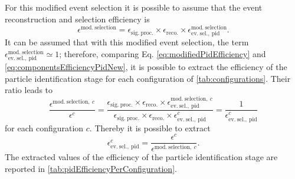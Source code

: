 For this modified event selection it is possible to assume that the event reconstruction and selection efficiency is \begin{equation}
    \epsilon^\mathrm{mod.\ selection} = \epsilon_\mathrm{sig.\ proc.} \times 
        \epsilon_\mathrm{reco.} \times 
        \epsilon_\mathrm{ev.\ sel.,\ pid}^\mathrm{mod.\ selection}. 
        \label{eq:modifiedPidEfficiency}
\end{equation} It can be assumed that with this modified event selection, the term $\epsilon_\mathrm{ev.\ sel.,\ pid}^\mathrm{mod.\ selection}\simeq1$; therefore, comparing Eq. \eqref{eq:modifiedPidEfficiency} and \eqref{eq:componentsEfficiencyPidNew}, it is possible to extract the efficiency of the particle identification stage for each configuration of \autoref{tab:configurations}. Their ratio leads to \begin{equation}
    \frac{
    \epsilon^{\mathrm{mod.\ selection,}\ c}
    }{
    \epsilon^{c}
    } = \frac{
    \epsilon_\mathrm{sig.\ proc.} \times 
    \epsilon_\mathrm{reco.} \times 
    \epsilon_\mathrm{ev.\ sel.,\ pid}^{\mathrm{mod.\ selection,}\ c}
    }{
    \epsilon_\mathrm{sig.\ proc.} \times 
    \epsilon_\mathrm{reco.} \times 
    \epsilon_\mathrm{ev.\ sel.,\ pid}^c
    } = \frac1{\epsilon_\mathrm{ev.\ sel.,\ pid}^c}
\end{equation} for each configuration $c$. Thereby it is possible to extract \begin{equation}
    \epsilon_\mathrm{ev.\ sel.,\ pid}^c = \frac{
    \epsilon^{c}
    }{
    \epsilon^{\mathrm{mod.\ selection,}\ c}
    }. 
\end{equation} The extracted values of the efficiency of the particle identification stage are reported in \autoref{tab:pidEfficiencyPerConfiguration}. 

